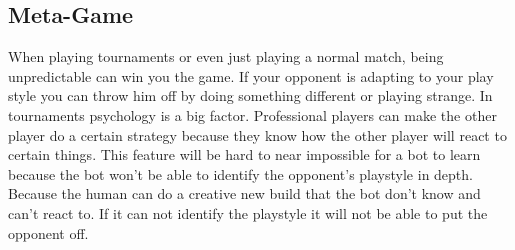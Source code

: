 \subsection{Meta-Game}		
		When playing tournaments or even just playing a normal match, being unpredictable can win you the game. 
		If your opponent is adapting to your play style you can throw him off by doing something different or playing strange.
		In tournaments psychology is a big factor. Professional players can make the other player do a certain strategy because they know 
		how the other player will react to certain things. This feature will be hard to near impossible for a bot to learn because the bot won't be able to 
		identify the opponent's playstyle in depth. Because the human can do a creative new build that the bot don't know and can't react to. 
		If it can not identify the playstyle it will not be able to put the opponent off.
